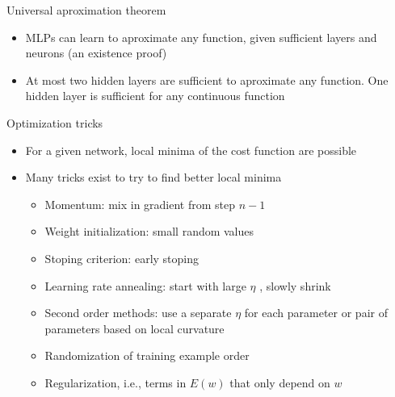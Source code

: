 \documentclass[notes]{beamer}
\providecommand{\tightlist}{%
  \setlength{\itemsep}{0pt}\setlength{\parskip}{0pt}}
\begin{document}
\begin{frame}{Universal aproximation theorem}

\begin{itemize}
\tightlist
\item
  MLPs can learn to aproximate any function, given sufficient layers and
  neurons (an existence proof)
\item
  At most two hidden layers are sufficient to aproximate any function.
  One hidden layer is sufficient for any continuous function
\end{itemize}

\end{frame}

\begin{frame}{Optimization tricks}

\begin{itemize}
\tightlist
\item
  For a given network, local minima of the cost function are possible
\item
  Many tricks exist to try to find better local minima

  \begin{itemize}
  \tightlist
  \item
    Momentum: mix in gradient from step \(n - 1\)
  \item
    Weight initialization: small random values
  \item
    Stoping criterion: early stoping
  \item
    Learning rate annealing: start with large \(\eta\) , slowly shrink
  \item
    Second order methods: use a separate \(\eta\) for each parameter or
    pair of parameters based on local curvature
  \item
    Randomization of training example order
  \item
    Regularization, i.e., terms in \(E(w)\) that only depend on \(w\)
  \end{itemize}
\end{itemize}

\end{frame}
\end{document}
